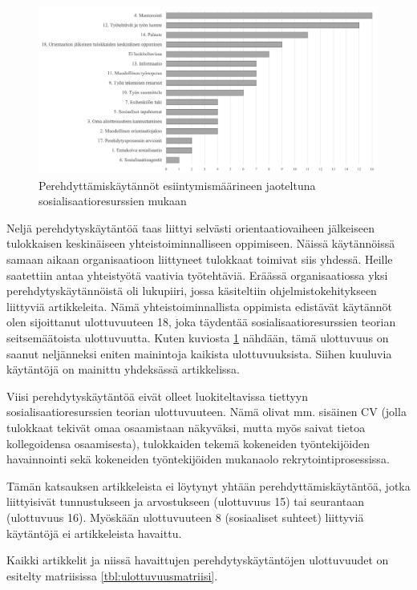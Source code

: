 \documentclass[utf8]{gradu3}
\begin{document}
\begin{figure}[h]
    \centering
    \includegraphics[width=\textwidth]{media/ulottuvuudet.png}
    \caption{Perehdyttämiskäytännöt esiintymismäärineen jaoteltuna sosialisaatioresurssien \parencite{saks-gruman-2012} mukaan}
    \label{kuvio:ulottuvuudet}
\end{figure}

Neljä perehdytyskäytäntöä taas liittyi selvästi orientaatiovaiheen jälkeiseen tulokkaisen keskinäiseen yhteistoiminnalliseen oppimiseen. Näissä käytännöissä samaan aikaan organisaatioon liittyneet tulokkaat toimivat siis yhdessä. Heille saatettiin antaa yhteistyötä vaativia työtehtäviä. Eräässä organisaatiossa yksi perehdytyskäytännöistä oli lukupiiri, jossa käsiteltiin ohjelmistokehitykseen liittyviä artikkeleita. Nämä yhteistoiminnallista oppimista edistävät käytännöt olen sijoittanut ulottuvuuteen 18, joka täydentää sosialisaatioresurssien teorian seitsemäätoista ulottuvuutta. Kuten kuviosta \ref{kuvio:ulottuvuudet} nähdään, tämä ulottuvuus on saanut neljänneksi eniten mainintoja kaikista ulottuvuuksista. Siihen kuuluvia käytäntöjä on mainittu yhdeksässä artikkelissa. 

Viisi perehdytyskäytäntöä eivät olleet luokiteltavissa tiettyyn sosialisaatioresurssien teorian ulottuvuuteen. Nämä olivat mm. sisäinen CV (jolla tulokkaat tekivät omaa osaamistaan näkyväksi, mutta myös saivat tietoa kollegoidensa osaamisesta), tulokkaiden tekemä kokeneiden työntekijöiden havainnointi sekä kokeneiden työntekijöiden mukanaolo rekrytointiprosessissa. 

Tämän katsauksen artikkeleista ei löytynyt yhtään perehdyttämiskäytäntöä, jotka liittyisivät tunnustukseen ja arvostukseen (ulottuvuus 15) tai seurantaan (ulottuvuus 16). Myöskään ulottuvuuteen 8 (sosiaaliset suhteet) liittyviä käytäntöjä ei artikkeleista havaittu.

Kaikki artikkelit ja niissä havaittujen perehdytyskäytäntöjen ulottuvuudet on esitelty matriisissa \ref{tbl:ulottuvuusmatriisi}.
\end{document}
